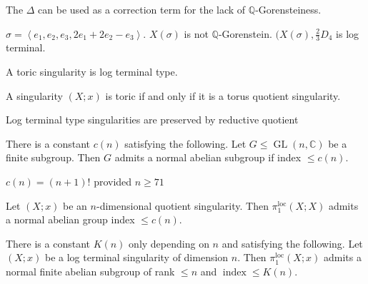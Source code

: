 \begin{remark}
\label{remark-moraga-4}
The $\Delta$ can be used as a correction term
for the lack of $\mathbb{Q}$-Gorensteiness.
\end{remark}

\begin{example}
\label{example-moraga-6}
$\sigma=\left\langle{}
e_{1},e_{2},e_{3},2e_{1}+2e_{2}-e_{3}
\right\rangle{} $. $X(\sigma)$ is not
$\mathbb{Q}$-Gorenstein.
$(X(\sigma),\frac{2}{3}D_{4}$ is log
terminal.
\end{example}

\begin{theorem}
\label{theorem-moraga-10}
A toric singularity is log terminal type.
\end{theorem}

\begin{theorem}
\label{theorem-moraga-11}
A singularity $(X;x)$ is toric if and only if
it is a torus quotient singularity.
\end{theorem}

\begin{theorem}
\label{theorem-moraga-12}
Log terminal type singularities are preserved
by reductive quotient
\end{theorem}

\begin{theorem}[Jordan, 1870's]
\label{theorem-moraga-13}
There is a constant $c(n)$ satisfying the
following. Let $G\leq
\operatorname{GL}(n,\mathbb{C})$ be a finite
subgroup. Then $G$ admits a normal abelian
subgroup if index $\leq c(n)$.
\end{theorem}

\begin{theorem}[Collins, 2010]
\label{theorem-moraga-14}
$c(n)=(n+1)!$ provided $n\geq 71$
\end{theorem}

\begin{corollary}
\label{corollary-moraga-1}
Let $(X;x)$ be an $n$-dimensional quotient
singularity. Then
$\pi_{1}^{\operatorname{loc}}(X;X)$ admits a
normal abelian group index $\leq c(n)$.
\end{corollary}

\begin{theorem}
\label{theorem-moraga-15}
There is a constant $K(n)$ only depending on
$n$ and satisfying the following. Let $(X;x)$
be a log terminal singularity of dimension
$n$. Then $\pi_{1}^{\operatorname{loc}}(X;x)$
admits a normal finite abelian subgroup of
rank $\leq n$ and $\operatorname{index}\leq
K(n)$.
\end{theorem}

